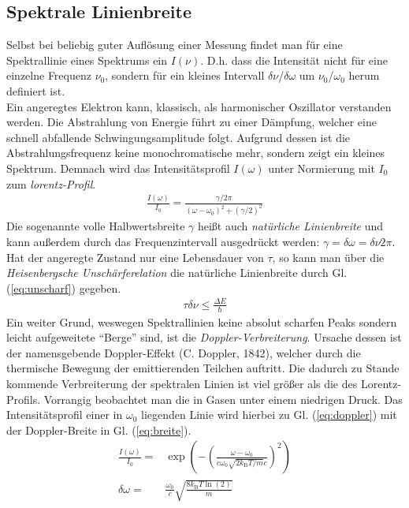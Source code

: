 \documentclass[numbers=noenddot,12pt,a4paper]{scrartcl}
\newcommand{\ix}[1]{_\text{#1}}
\newcommand{\tilt}[1]{\textit{#1}}
\begin{document}
\subsection{Spektrale Linienbreite}\label{subsec:breite}
Selbst bei beliebig guter Auflösung einer Messung findet man für eine Spektrallinie eines Spektrums ein $I(\nu)$. D.h. dass die Intensität nicht für eine einzelne Frequenz $\nu\ix{0}$, sondern für ein kleines Intervall $\delta\nu$/$\delta\omega$ um $\nu\ix{0}$/$\omega\ix{0}$ herum definiert ist.\\
Ein angeregtes Elektron kann, klassisch, als harmonischer Oszillator verstanden werden. Die Abstrahlung von Energie führt zu einer Dämpfung, welcher eine schnell abfallende Schwingungsamplitude folgt. Aufgrund dessen ist die Abstrahlungsfrequenz keine monochromatische mehr, sondern zeigt ein kleines Spektrum. Demnach wird das Intensitätsprofil $I(\omega)$ unter Normierung mit $I\ix{0}$ zum \tilt{lorentz-Profil}.
\begin{align}
	\frac{I(\omega)}{I\ix{0}}=\frac{\gamma/2\pi}{\left(\omega-\omega\ix{0}\right)^2+\left(\gamma/2\right)^2}
\end{align}
Die sogenannte volle Halbwertsbreite $\gamma$ heißt auch \tilt{natürliche Linienbreite} und kann außerdem durch das Frequenzintervall ausgedrückt werden: $\gamma=\delta\omega=\delta\nu 2\pi$.\\
Hat der angeregte Zustand nur eine Lebensdauer von $\tau$, so kann man über die \tilt{Heisenbergsche Unschärferelation} die natürliche Linienbreite durch Gl. (\ref{eq:unscharf}) gegeben.
\begin{align}
	\tau \delta\nu \leq\frac{\Delta E}{\hbar} \label{eq:unscharf}
\end{align}
Ein weiter Grund, weswegen Spektrallinien keine absolut scharfen Peaks sondern leicht aufgeweitete "`Berge"' sind, ist die \tilt{Doppler-Verbreiterung}. Ursache dessen ist der namensgebende Doppler-Effekt (C. Doppler, 1842), welcher durch die thermische Bewegung der emittierenden Teilchen auftritt. Die dadurch zu Stande kommende Verbreiterung der spektralen Linien ist viel größer als die des Lorentz-Profils. Vorrangig beobachtet man die in Gasen unter einem niedrigen Druck. Das Intensitätsprofil einer in $\omega\ix{0}$ liegenden Linie wird hierbei zu Gl. (\ref{eq:doppler}) mit der Doppler-Breite in Gl. (\ref{eq:breite}).
\begin{align}
	\frac{I(\omega)}{I\ix{0}}=&\exp\left({-\left(\frac{\omega-\omega\ix{0}}{c\omega\ix{0}\sqrt{2k\ix{B}T/m}c}\right)^2}\right)\label{eq:doppler}\\
	\delta\omega=&\frac{\omega\ix{0}}{c}\sqrt{\frac{8k\ix{B}T\ln\left(2\right)}{m}}\label{eq:breite}
\end{align}
\end{document}
